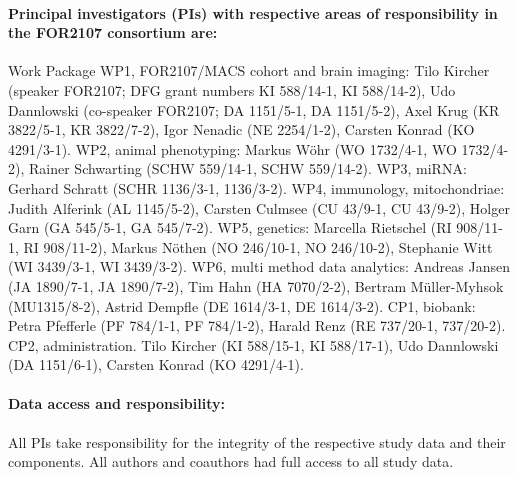 \documentclass{article}
\begin{document}
    \paragraph{Principal investigators (PIs) with respective areas of responsibility in the FOR2107 consortium are:}
    Work Package WP1, FOR2107/MACS cohort and brain imaging: Tilo Kircher (speaker FOR2107; DFG grant numbers KI 588/14-1, KI 588/14-2), Udo Dannlowski (co-speaker FOR2107; DA 1151/5-1, DA 1151/5-2), Axel Krug (KR 3822/5-1, KR 3822/7-2), Igor Nenadic (NE 2254/1-2), Carsten Konrad (KO 4291/3-1). WP2, animal phenotyping: Markus Wöhr (WO 1732/4-1, WO 1732/4-2), Rainer Schwarting (SCHW 559/14-1, SCHW 559/14-2). WP3, miRNA: Gerhard Schratt (SCHR 1136/3-1, 1136/3-2). WP4, immunology, mitochondriae: Judith Alferink (AL 1145/5-2), Carsten Culmsee (CU 43/9-1, CU 43/9-2), Holger Garn (GA 545/5-1, GA 545/7-2). WP5, genetics: Marcella Rietschel (RI 908/11-1, RI 908/11-2), Markus Nöthen (NO 246/10-1, NO 246/10-2), Stephanie Witt (WI 3439/3-1, WI 3439/3-2). WP6, multi method data analytics: Andreas Jansen (JA 1890/7-1, JA 1890/7-2), Tim Hahn (HA 7070/2-2), Bertram Müller-Myhsok (MU1315/8-2), Astrid Dempfle (DE 1614/3-1, DE 1614/3-2). CP1, biobank: Petra Pfefferle (PF 784/1-1, PF 784/1-2), Harald Renz (RE 737/20-1, 737/20-2). CP2, administration. Tilo Kircher (KI 588/15-1, KI 588/17-1), Udo Dannlowski (DA 1151/6-1), Carsten Konrad (KO 4291/4-1).

    \paragraph{Data access and responsibility:}
    All PIs take responsibility for the integrity of the respective study data and their components. All authors and coauthors had full access to all study data.
\end{document}
